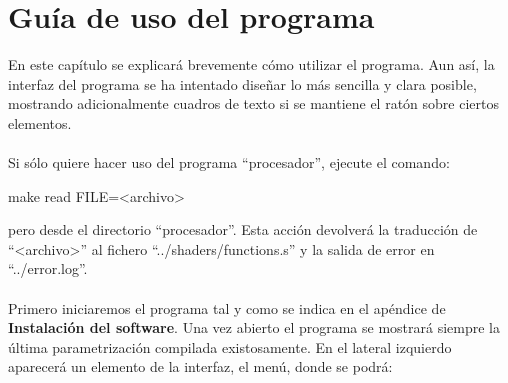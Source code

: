 
\chapter{Guía de uso del programa}\label{ap:apendice2}

En este capítulo se explicará brevemente cómo utilizar el programa. Aun así, la interfaz del programa se ha intentado diseñar lo más sencilla y clara posible, mostrando adicionalmente cuadros de texto si se mantiene el ratón sobre ciertos elementos.\\
\\Si sólo quiere hacer uso del programa ``procesador'', ejecute el comando:
\begin{center}
 make read FILE=<archivo>
\end{center}
pero desde el directorio ``procesador''. Esta acción devolverá la traducción de ``<archivo>'' al fichero ``../shaders/functions.s'' y la salida de error en ``../error.log''.\\
\\Primero iniciaremos el programa tal y como se indica en el apéndice de \textbf{Instalación del software}. Una vez abierto el programa se mostrará siempre la última parametrización compilada existosamente. En el lateral izquierdo aparecerá un elemento de la interfaz, el menú, donde se podrá:

